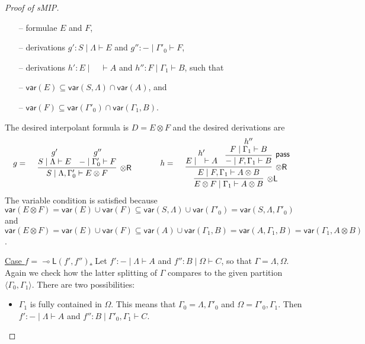 \documentclass[sn-mathphys-num]{sn-jnl}%
\newcommand{\GG}{\Gamma}
\newcommand{\GL}{\Lambda}
\newcommand{\GO}{\Omega}
\newcommand{\vd}{\vdash}
\newcommand{\tl}{\otimes \mathsf{L}}
\newcommand{\tr}{\otimes\mathsf{R}}
\newcommand{\pass}{\mathsf{pass}}
\newcommand{\ot}{\otimes}
\newcommand{\lolli}{\multimap}
\newcommand{\lleft}{{\lolli}\mathsf{L}}
\newcommand{\proofbox}[1]{\begin{tabular}{l} #1 \end{tabular}}
\newcommand{\mf}[1]{\mathsf{#1}}
\newcommand{\vars}[1]{\mf{var} (#1)}
\newcommand{\sMIP}{\textsf{sMIP}}
\theoremstyle{thmstyleone}%
\theoremstyle{thmstyletwo}%
\theoremstyle{thmstylethree}%
\begin{document}
\begin{proof}[Proof of \sMIP]
\begin{itemize}
\begin{itemize}
      \item[--] formulae $E$ and $F$,
      \item[--] derivations $g' : S \mid \GL \vd E$ and $g'' : {-} \mid \GG'_0 \vd F$,
      \item[--] derivations $h' : E \mid \quad \vd A$ and $h'' : F \mid \GG_1 \vd B$, such that
      \item[--] $\vars{E} \subseteq \vars{S, \GL} \cap \vars{A}$, and
      \item[--] $\vars{F} \subseteq \vars{\GG'_0} \cap \vars{\GG_1, B}$.
    \end{itemize}
    The desired interpolant formula is $D = E \ot F$ and the desired derivations are
    \begin{displaymath}
      \begin{array}{c}
        \begin{array}{c}
          g
          =
          \proofbox{\infer[\tr]{S \mid \GL , \GG'_0 \vd E \ot F}{
          \deduce{S \mid \GL \vd E}{g'}
          &
          \deduce{{-} \mid \GG'_0 \vd F}{g''}
          }}
        \end{array}
        \qquad
        \begin{array}{c}
          h
          =
          \proofbox{\infer[\tl]{E \ot F \mid \GG_1 \vd A \ot B}{
          \infer[\tr]{E \mid F , \GG_1 \vd A \ot B}{
          \deduce{E \mid \quad \vd A}{h'}
          &
          \infer[\pass]{{-} \mid F , \GG_1 \vd B}{
          \deduce{F \mid \GG_1 \vd B}{h''}
          }
          }
          }}
        \end{array}
      \end{array}
    \end{displaymath}
    The variable condition is satisfied because $\vars{E \ot F} = \vars{E} \cup \vars{F} \subseteq \vars{S , \GL} \cup \vars{\GG'_0} = \vars{S, \GL , \GG'_0}$ and $\vars{E \ot F} = \vars{E} \cup \vars{F} \subseteq \vars{A} \cup \vars{\GG_1 , B} = \vars{A, \GG_1 , B} = \vars{\GG_1, A \ot B}$.
  \end{itemize}
  \underline{Case $f = \lleft(f',f'')$.}
  Let $f' : {-} \mid \GL \vd A$ and $f'' : B \mid \GO \vd C$, so that $\GG = \GL,\GO$. 
  Again we check how the latter splitting of $\GG$ compares to the given partition $\langle \GG_0,\GG_1 \rangle$. 
  There are two possibilities:
  \begin{itemize}
    \item  $\GG_1$ is fully contained in $\GO$. 
    This means that $\GG_0 = \GL,\GG'_0$ and $\GO = \GG'_0,\GG_1$.
    Then $f' : {-} \mid \GL \vd A$ and $f'' : B \mid \GG'_0 , \GG_1 \vd C$.

\end{itemize}
\end{proof}
\end{document}
